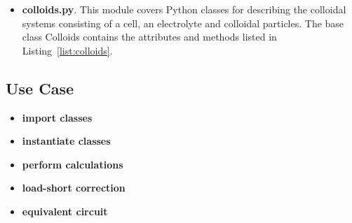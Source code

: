  \begin{itemize}
     \item \textbf{colloids.py}. This module covers Python classes for describing the colloidal systems consisting of a cell, an electrolyte and colloidal particles. The base class \textsf{Colloids} contains the attributes and methods listed in Listing~\ref{list:colloids}.
 \end{itemize}
 
% 

\subsection{Use Case}

 \begin{itemize}
	\item \textbf{import classes}
\end{itemize}

% 

 \begin{itemize}
	\item \textbf{instantiate classes}
\end{itemize}

% 

 \begin{itemize}
	\item \textbf{perform calculations}
\end{itemize}

% 

 \begin{itemize}
	\item \textbf{load-short correction}
\end{itemize}

% 

 \begin{itemize}
	\item \textbf{equivalent circuit}
\end{itemize}

